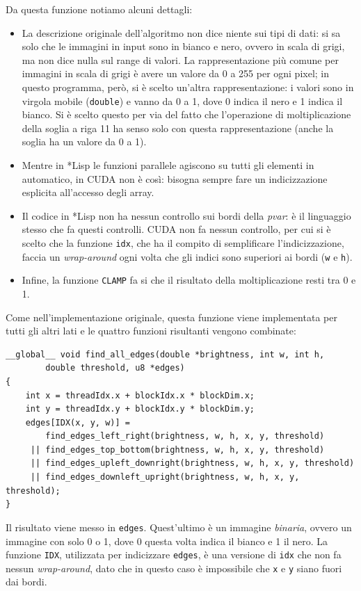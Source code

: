 \documentclass[12pt,a4paper,openright,twoside]{report}
\begin{document}
Da questa funzione notiamo alcuni dettagli:

\begin{itemize}
    \item La descrizione originale dell'algoritmo non dice niente sui tipi di dati: si sa solo che le immagini in input sono in bianco e nero, ovvero in scala di grigi, ma non dice nulla sul range di valori. La rappresentazione più comune per immagini in scala di grigi è avere un valore da 0 a 255 per ogni pixel; in questo programma, però, si è scelto un'altra rappresentazione: i valori sono in virgola mobile (\verb|double|) e vanno da 0 a 1, dove 0 indica il nero e 1 indica il bianco. Si è scelto questo per via del fatto che l'operazione di moltiplicazione della soglia a riga 11 ha senso solo con questa rappresentazione (anche la soglia ha un valore da 0 a 1).
        \item Mentre in *Lisp le funzioni parallele agiscono su tutti gli elementi in automatico, in CUDA non è così: bisogna sempre fare un indicizzazione esplicita all'accesso degli array.
    \item Il codice in *Lisp non ha nessun controllo sui bordi della \textit{pvar}: è il linguaggio stesso che fa questi controlli. CUDA non fa nessun controllo, per cui si è scelto che la funzione \verb|idx|, che ha il compito di semplificare l'indicizzazione, faccia un \textit{wrap-around} ogni volta che gli indici sono superiori ai bordi (\verb|w| e \verb|h|).
    \item Infine, la funzione \verb|CLAMP| fa si che il risultato della moltiplicazione resti tra 0 e 1.
\end{itemize}

Come nell'implementazione originale, questa funzione viene implementata per tutti gli altri lati e le quattro funzioni risultanti vengono combinate:

\begin{lstlisting}[style=mystyle]
__global__ void find_all_edges(double *brightness, int w, int h,
        double threshold, u8 *edges)
{
    int x = threadIdx.x + blockIdx.x * blockDim.x;
    int y = threadIdx.y + blockIdx.y * blockDim.y;
    edges[IDX(x, y, w)] =
        find_edges_left_right(brightness, w, h, x, y, threshold)
     || find_edges_top_bottom(brightness, w, h, x, y, threshold)
     || find_edges_upleft_downright(brightness, w, h, x, y, threshold)
     || find_edges_downleft_upright(brightness, w, h, x, y, threshold);
}
\end{lstlisting}

Il risultato viene messo in \verb|edges|. Quest'ultimo è un immagine \textit{binaria}, ovvero un immagine con solo 0 o 1, dove 0 questa volta indica il bianco e 1 il nero. La funzione \verb|IDX|, utilizzata per indicizzare \verb|edges|, è una versione di \verb|idx| che non fa nessun \textit{wrap-around}, dato che in questo caso è impossibile che \verb|x| e \verb|y| siano fuori dai bordi.
\end{document}
